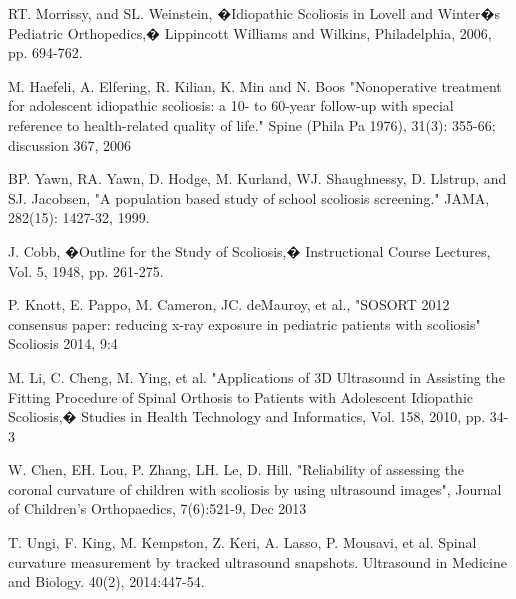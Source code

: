 \documentclass{article}
\begin{document}

\begin{thebibliography}{}
%
RT. Morrissy, and SL. Weinstein, �Idiopathic Scoliosis in Lovell and Winter�s Pediatric Orthopedics,� Lippincott Williams and Wilkins, Philadelphia, 2006, pp. 694-762.

M. Haefeli, A. Elfering, R. Kilian, K. Min and N. Boos "Nonoperative treatment for adolescent idiopathic scoliosis: a 10- to 60-year follow-up with special reference to health-related quality of life." Spine (Phila Pa 1976), 31(3): 355-66; discussion 367, 2006

BP. Yawn, RA. Yawn, D. Hodge, M. Kurland, WJ. Shaughnessy, D. Llstrup, and SJ. Jacobsen, "A population based study of school scoliosis screening." JAMA, 282(15): 1427-32, 1999.

J. Cobb, �Outline for the Study of Scoliosis,� Instructional Course Lectures, Vol. 5, 1948, pp. 261-275. 

P. Knott, E. Pappo, M. Cameron, JC. deMauroy, et al., "SOSORT 2012 consensus paper: reducing x-ray exposure in pediatric patients with scoliosis" Scoliosis 2014, 9:4

M. Li, C. Cheng, M. Ying, et al. "Applications of 3D Ultrasound in Assisting the Fitting Procedure of Spinal Orthosis to Patients with Adolescent Idiopathic Scoliosis,� Studies in Health Technology and Informatics, Vol. 158, 2010, pp. 34-3

W. Chen, EH. Lou, P. Zhang, LH. Le, D. Hill. "Reliability of assessing the coronal curvature of children with scoliosis by using ultrasound images", Journal of Children's Orthopaedics, 7(6):521-9, Dec 2013

T. Ungi, F. King, M. Kempston, Z. Keri, A. Lasso, P. Mousavi, et al.  Spinal curvature measurement by tracked ultrasound snapshots. Ultrasound in Medicine and Biology. 40(2), 2014:447-54.

\end{thebibliography}


\end{document}
